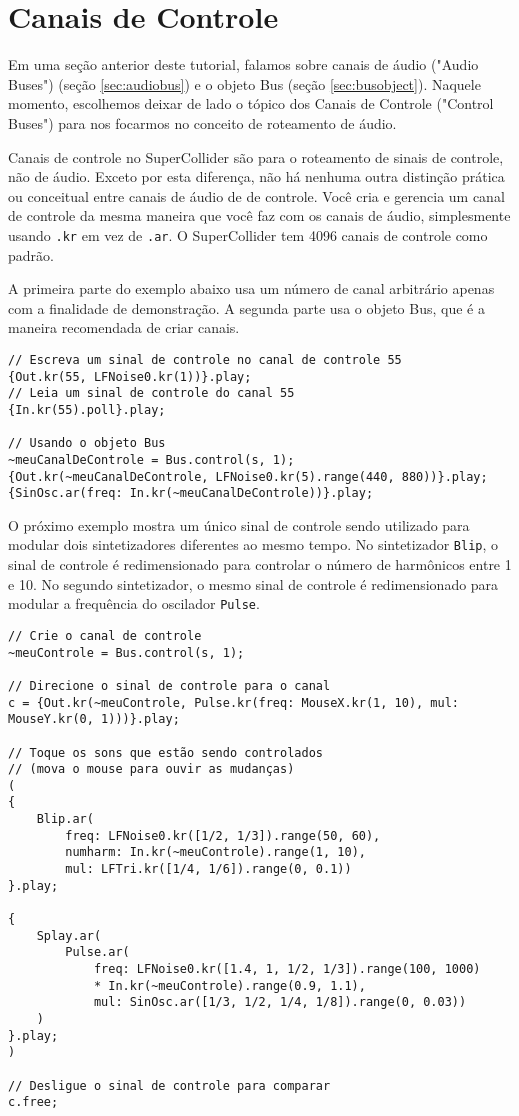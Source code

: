 \section{Canais de Controle}
\label{sec:control-buses}

Em uma seção anterior deste tutorial, falamos sobre canais de áudio ("Audio Buses") (seção \ref{sec:audiobus}) e o objeto Bus (seção \ref{sec:busobject}). Naquele momento, escolhemos deixar de lado o tópico dos Canais de Controle ("Control Buses") para nos focarmos no conceito de roteamento de áudio.

Canais de controle no SuperCollider são para o roteamento de sinais de controle, não de áudio. Exceto por esta diferença, não há nenhuma outra distinção prática ou conceitual entre canais de áudio de de controle. Você cria e gerencia um canal de controle da mesma maneira que você faz com os canais de áudio, simplesmente usando \texttt{.kr} em vez de \texttt{.ar}. O SuperCollider tem  4096 canais de controle como padrão.

A primeira parte do exemplo abaixo usa um número de canal arbitrário apenas com a finalidade de demonstração. A segunda parte usa o objeto Bus, que é a maneira recomendada de criar canais.


\begin{lstlisting}[style=SuperCollider-IDE, basicstyle=\scttfamily\footnotesize]
// Escreva um sinal de controle no canal de controle 55
{Out.kr(55, LFNoise0.kr(1))}.play;
// Leia um sinal de controle do canal 55
{In.kr(55).poll}.play;

// Usando o objeto Bus
~meuCanalDeControle = Bus.control(s, 1);
{Out.kr(~meuCanalDeControle, LFNoise0.kr(5).range(440, 880))}.play;
{SinOsc.ar(freq: In.kr(~meuCanalDeControle))}.play;
\end{lstlisting}

O próximo exemplo mostra um único sinal de controle sendo utilizado para modular dois sintetizadores diferentes ao mesmo tempo. No sintetizador \texttt{Blip}, o sinal de controle é redimensionado para controlar o número de harmônicos entre 1 e 10. No segundo sintetizador, o mesmo sinal de controle é redimensionado para modular a frequência do oscilador \texttt{Pulse}.

\begin{lstlisting}[style=SuperCollider-IDE, basicstyle=\scttfamily\footnotesize]
// Crie o canal de controle
~meuControle = Bus.control(s, 1);

// Direcione o sinal de controle para o canal
c = {Out.kr(~meuControle, Pulse.kr(freq: MouseX.kr(1, 10), mul: MouseY.kr(0, 1)))}.play;

// Toque os sons que estão sendo controlados
// (mova o mouse para ouvir as mudanças)
(
{
	Blip.ar(
		freq: LFNoise0.kr([1/2, 1/3]).range(50, 60),
		numharm: In.kr(~meuControle).range(1, 10),
		mul: LFTri.kr([1/4, 1/6]).range(0, 0.1))
}.play;

{
	Splay.ar(
		Pulse.ar(
			freq: LFNoise0.kr([1.4, 1, 1/2, 1/3]).range(100, 1000)
			* In.kr(~meuControle).range(0.9, 1.1),
			mul: SinOsc.ar([1/3, 1/2, 1/4, 1/8]).range(0, 0.03))
	)
}.play;
)

// Desligue o sinal de controle para comparar
c.free;
\end{lstlisting}

